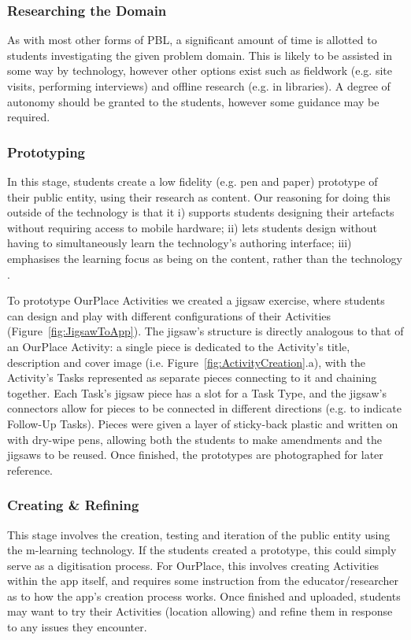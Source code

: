 \documentclass[,hyphens]{sigchi}
\begin{document}
\subsubsection{Researching the Domain}
As with most other forms of PBL, a significant amount of time is allotted to students investigating the given problem domain. This is likely to be assisted in some way by technology, however other options exist such as fieldwork (e.g. site visits, performing interviews) and offline research (e.g. in libraries). A degree of autonomy should be granted to the students, however some guidance may be required.

\subsubsection{Prototyping}
In this stage, students create a low fidelity (e.g. pen and paper) prototype of their public entity, using their research as content. Our reasoning for doing this outside of the technology is that it i) supports students designing their artefacts without requiring access to mobile hardware; ii) lets students design without having to simultaneously learn the technology's authoring interface; iii) emphasises the learning focus as being on the content, rather than the technology \cite{Bell2010}. 

To prototype OurPlace Activities we created a jigsaw exercise, where students can design and play with different configurations of their Activities (Figure~\ref{fig:JigsawToApp}). The jigsaw's structure is directly analogous to that of an OurPlace Activity: a single piece is dedicated to the Activity's title, description and cover image (i.e. Figure~\ref{fig:ActivityCreation}.a), with the Activity's Tasks represented as separate pieces connecting to it and chaining together. Each Task's jigsaw piece has a slot for a Task Type, and the jigsaw's connectors allow for pieces to be connected in different directions (e.g. to indicate Follow-Up Tasks). Pieces were given a layer of sticky-back plastic and written on with dry-wipe pens, allowing  both the students to make amendments and the jigsaws to be reused. Once finished, the prototypes are photographed for later reference.

\subsubsection{Creating \& Refining}
This stage involves the creation, testing and iteration of the public entity using the m-learning technology. If the students created a prototype, this could simply serve as a digitisation process. For OurPlace, this involves creating Activities within the app itself, and requires some instruction from the educator/researcher as to how the app's creation process works. Once finished and uploaded, students may want to try their Activities (location allowing) and refine them in response to any issues they encounter. 
\end{document}
